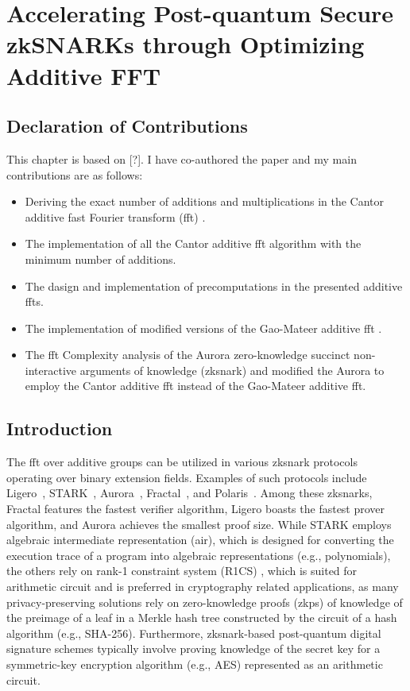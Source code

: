 \chapter{Accelerating Post-quantum Secure zkSNARKs through Optimizing Additive FFT}\label{ch:additive-fft}

\section*{Declaration of Contributions}
This chapter is based on [?]. I have co-authored the paper and my main contributions are as follows:
\begin{itemize}
	\item Deriving the exact number of additions and multiplications in the Cantor additive fast Fourier transform (\gls{fft}) \cite{Cantor1989FFT}. 
	\item The \CC implementation of all the Cantor additive \gls{fft} algorithm with the minimum number of additions.
	\item The dasign and implementation of precomputations in the presented additive \gls{fft}s.
	\item The \CC implementation of modified versions of the Gao-Mateer additive \gls{fft} \cite{Gao2010FFT}.
	\item  The \gls{fft} Complexity analysis of the Aurora zero-knowledge succinct non-interactive arguments of knowledge (\gls{zksnark}) and modified the Aurora  \CC  to employ  the Cantor additive \gls{fft} instead of  the Gao-Mateer additive \gls{fft}.
\end{itemize}

\section{Introduction}

The \gls{fft} over additive groups can be utilized in various \gls{zksnark} protocols operating over binary extension fields. Examples of such protocols include Ligero~\cite{Ames2017Ligero}, STARK~\cite{Ben-Sasson2018STARK}, Aurora~\cite{Aurora2019}, Fractal~\cite{Chiesa2020Fractal}, and Polaris~\cite{Polaris}. Among these \gls{zksnark}s, Fractal features the fastest verifier algorithm, Ligero boasts the fastest prover algorithm, and Aurora achieves the smallest proof size. While STARK employs algebraic intermediate representation (\gls{air}), which is designed for converting the execution trace of a program into algebraic representations (e.g., polynomials), the others rely on rank-1 constraint system (R1CS) \cite{Gong2024}, which is suited for arithmetic circuit and is preferred in cryptography related applications, as many privacy-preserving solutions rely on zero-knowledge proofs (\gls{zkp}s) of knowledge of the preimage of a leaf in a Merkle hash tree constructed by the circuit of a hash algorithm (e.g., SHA-256). Furthermore, \gls{zksnark}-based post-quantum digital signature schemes typically involve proving knowledge of the secret key for a symmetric-key encryption algorithm (e.g., AES) represented as an arithmetic circuit.

